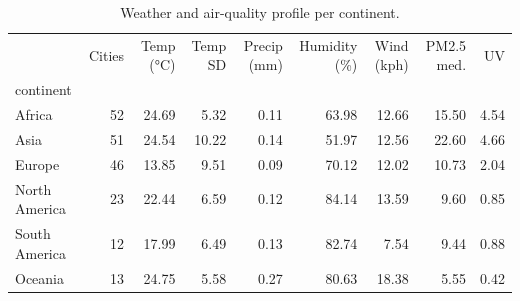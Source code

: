 \begin{table}
\caption{Weather and air-quality profile per continent.}
\label{tab:continents}
\begin{tabular}{lrrrrrrrr}
\toprule
 & Cities & Temp (°C) & Temp SD & Precip (mm) & Humidity (\%) & Wind (kph) & PM2.5 med. & UV \\
continent &  &  &  &  &  &  &  &  \\
\midrule
Africa & 52 & 24.69 & 5.32 & 0.11 & 63.98 & 12.66 & 15.50 & 4.54 \\
Asia & 51 & 24.54 & 10.22 & 0.14 & 51.97 & 12.56 & 22.60 & 4.66 \\
Europe & 46 & 13.85 & 9.51 & 0.09 & 70.12 & 12.02 & 10.73 & 2.04 \\
North America & 23 & 22.44 & 6.59 & 0.12 & 84.14 & 13.59 & 9.60 & 0.85 \\
South America & 12 & 17.99 & 6.49 & 0.13 & 82.74 & 7.54 & 9.44 & 0.88 \\
Oceania & 13 & 24.75 & 5.58 & 0.27 & 80.63 & 18.38 & 5.55 & 0.42 \\
\bottomrule
\end{tabular}
\end{table}
